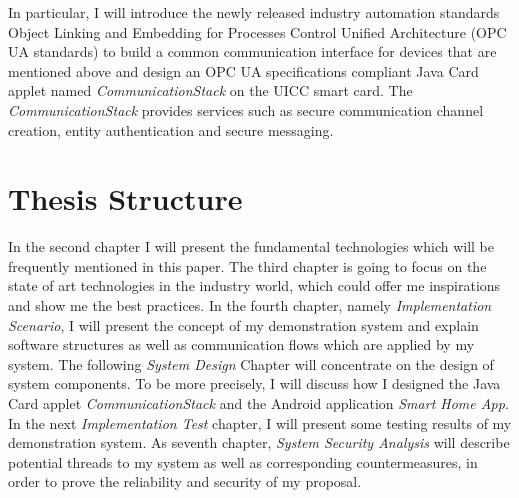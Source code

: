 In particular, I will introduce the newly released industry automation standards Object Linking and Embedding for Processes Control Unified Architecture (OPC UA standards) to build a common communication interface for devices that are mentioned above and design an OPC UA specifications compliant Java Card applet named \emph{CommunicationStack} on the UICC smart card. The \emph{CommunicationStack} provides services such as secure communication channel creation, entity authentication and secure messaging.

\section{Thesis Structure}
In the second chapter I will present the fundamental technologies which will be frequently mentioned in this paper. The third chapter is going to focus on the state of art technologies in the industry world, which could offer me inspirations and show me the best practices. In the fourth chapter, namely \emph{Implementation Scenario}, I will present the concept of my demonstration system and explain software structures as well as communication flows which are applied by my system. The following \emph{System Design} Chapter will concentrate on the design of system components. To be more precisely, I will discuss how I designed the Java Card applet \emph{CommunicationStack} and the Android application \emph{Smart Home App}. In the next \emph{Implementation Test} chapter, I will present some testing results of my demonstration system. As seventh chapter, \emph{System Security Analysis} will describe potential threads to my system as well as corresponding countermeasures, in order to prove the reliability and security of my proposal.